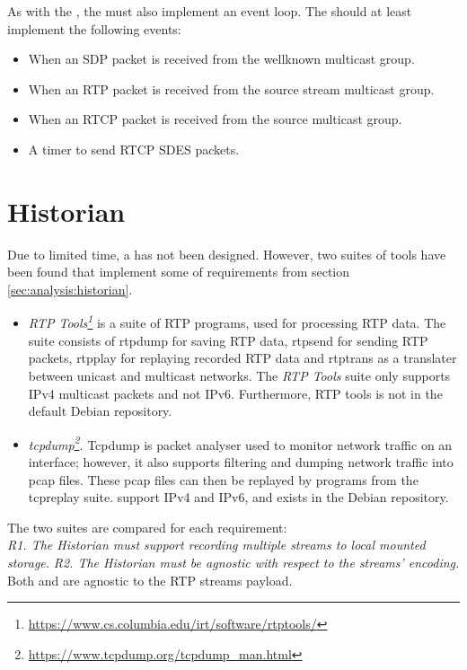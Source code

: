 As with the \pub{}, the \sub{} must also implement an event loop. The \sub{} should at least implement the following events:

\begin{itemize}
	\item When an SDP packet is received from the wellknown multicast group.
	\item When an RTP packet is received from the source stream multicast group.
	\item When an RTCP packet is received from the source multicast group.
	\item A timer to send RTCP SDES packets.
\end{itemize}



\section{Historian} \label{sec:design:historian}
Due to limited time, a \hist{} has not been designed. However, two suites of tools have been found that implement some of requirements from section \ref{sec:analysis:historian}.

\begin{itemize}
	\item \textit{RTP Tools\footnote{\url{https://www.cs.columbia.edu/irt/software/rtptools/}}} is a suite of RTP programs, used for processing RTP data. The suite consists of rtpdump for saving RTP data, rtpsend for sending RTP packets, rtpplay for replaying recorded RTP data and rtptrans as a translater between unicast and multicast networks. The \textit{RTP Tools} suite only supports IPv4 multicast packets and not IPv6. Furthermore, RTP tools is not in the default Debian repository.
	
	\item \textit{tcpdump\footnote{\url{https://www.tcpdump.org/tcpdump_man.html}}}. Tcpdump is packet analyser used to monitor network traffic on an interface; however, it also supports filtering and dumping network traffic into pcap files. These pcap files can then be replayed by programs from the tcpreplay suite.  support IPv4 and IPv6, and exists in the Debian repository.
\end{itemize}

\noindent{}The two suites are compared for each requirement:\\


\noindent{}\textit{R1. The Historian must support recording multiple streams to local mounted storage.}
\noindent{}\textit{R2. The Historian must be agnostic with respect to the streams’ encoding.}
Both  and  are agnostic to the RTP streams payload.\\

